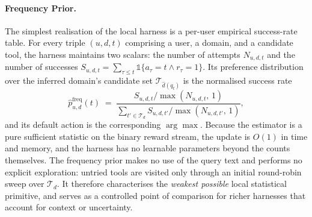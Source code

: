 


\paragraph{Frequency Prior.}
The simplest realisation of the local harness is a per-user empirical
success-rate table. For every triple $(u, d, t)$ comprising a user, a
domain, and a candidate tool, the harness maintains two scalars: the
number of attempts $N_{u,d,t}$ and the number of successes
$S_{u,d,t}\!=\!\sum_{\tau\le t}\mathbb{1}\{a_\tau\!=\!t\wedge r_\tau\!=\!1\}$.
Its preference distribution over the inferred domain's
candidate set $\mathcal{T}_{\hat d(q_t)}$ is the normalised success rate
\begin{equation}
\hat p^{\mathrm{freq}}_{u,d}(t) \;=\;
\frac{S_{u,d,t} / \max(N_{u,d,t},\,1)}
     {\sum_{t'\in\mathcal{T}_d} S_{u,d,t'} / \max(N_{u,d,t'},\,1)},
\label{eq:freq_prior}
\end{equation}
and its default action is the corresponding $\arg\max$. Because the
estimator is a pure sufficient statistic on the binary reward stream,
the update is $O(1)$ in time and memory, and the harness has no learnable
parameters beyond the counts themselves. The frequency prior makes no
use of the query text and performs no explicit exploration: untried
tools are visited only through an initial round-robin sweep over
$\mathcal{T}_d$. It therefore characterises the \emph{weakest possible}
local statistical primitive, and serves as a controlled point of
comparison for richer harnesses that account for context or
uncertainty.

